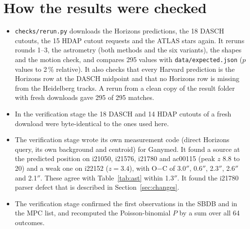 \documentclass[11pt]{article}
\newcommand{\as}{$''$}
\begin{document}
\section{How the results were checked}
\begin{itemize}
\item \texttt{checks/rerun.py} downloads the Horizons predictions, the 18 DASCH cutouts, the 15 HDAP cutout requests and the ATLAS stars again. It reruns rounds 1--3, the astrometry (both methods and the six variants), the shapes and the motion check, and compares 295 values with \texttt{data/expected.json} ($p$ values to 2\,\% relative). It also checks that every Harvard prediction is the Horizons row at the DASCH midpoint and that no Horizons row is missing from the Heidelberg tracks. A rerun from a clean copy of the result folder with fresh downloads gave 295 of 295 matches.
\item In the verification stage the 18 DASCH and 14 HDAP cutouts of a fresh download were byte-identical to the ones used here.
\item The verification stage wrote its own measurement code (direct Horizons query, its own background and centroid) for Ganymed. It found a source at the predicted position on i21050, i21576, i21780 and ac00115 (peak $z$ 8.8 to 20) and a weak one on i22152 ($z=3.4$), with O$-$C of 3.0\as, 0.6\as, 2.3\as, 2.6\as{} and 2.1\as. These agree with Table~\ref{tab:ast} within 1.3\as. It found the i21780 parser defect that is described in Section~\ref{sec:changes}.
\item The verification stage confirmed the first observations in the SBDB and in the MPC list, and recomputed the Poisson-binomial $P$ by a sum over all 64 outcomes.
\end{itemize}
\end{document}
